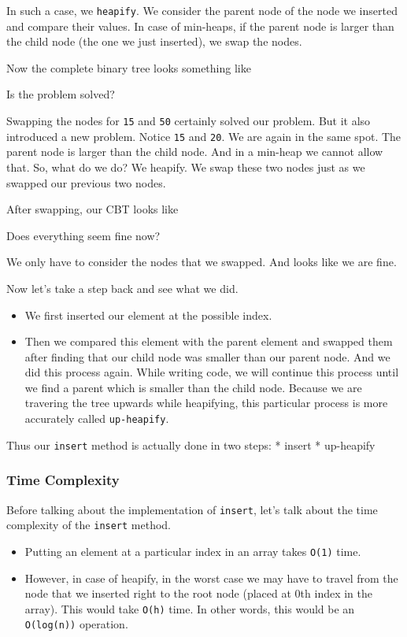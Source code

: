 \documentclass[11pt]{article}
\providecommand{\tightlist}{%
      \setlength{\itemsep}{0pt}\setlength{\parskip}{0pt}}
\begin{document}
In such a case, we \texttt{heapify}. We consider the parent node of the
node we inserted and compare their values. In case of min-heaps, if the
parent node is larger than the child node (the one we just inserted), we
swap the nodes.

Now the complete binary tree looks something like

    Is the problem solved?

Swapping the nodes for \texttt{15} and \texttt{50} certainly solved our
problem. But it also introduced a new problem. Notice \texttt{15} and
\texttt{20}. We are again in the same spot. The parent node is larger
than the child node. And in a min-heap we cannot allow that. So, what do
we do? We heapify. We swap these two nodes just as we swapped our
previous two nodes.

After swapping, our CBT looks like

Does everything seem fine now?

We only have to consider the nodes that we swapped. And looks like we
are fine.

Now let's take a step back and see what we did.

\begin{itemize}
\item
  We first inserted our element at the possible index.
\item
  Then we compared this element with the parent element and swapped them
  after finding that our child node was smaller than our parent node.
  And we did this process again. While writing code, we will continue
  this process until we find a parent which is smaller than the child
  node. Because we are travering the tree upwards while heapifying, this
  particular process is more accurately called \texttt{up-heapify}.
\end{itemize}

Thus our \texttt{insert} method is actually done in two steps: * insert
* up-heapify

    \subsubsection{Time Complexity}\label{time-complexity}

Before talking about the implementation of \texttt{insert}, let's talk
about the time complexity of the \texttt{insert} method.

\begin{itemize}
\tightlist
\item
  Putting an element at a particular index in an array takes
  \texttt{O(1)} time.
\item
  However, in case of heapify, in the worst case we may have to travel
  from the node that we inserted right to the root node (placed at 0th
  index in the array). This would take \texttt{O(h)} time. In other
  words, this would be an \texttt{O(log(n))} operation.
\end{itemize}
\end{document}
